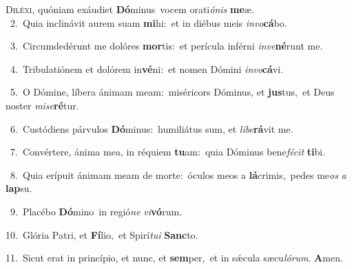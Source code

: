 \lettrine{\initial\textcolor{\initialcolor}{D}}{iléxi,} quóniam exáudiet \textbf{Dó}\-minus~\star vocem orati\-\textit{ó}\-\textit{nis} \textbf{me}\-æ.\\
{\numbfont\textcolor{\numbcolor}{~2.}}~Quia inclinávit aurem suam \textbf{mi}\-hi:~\star et in diébus meis \textit{in}\-\textit{vo}\textbf{cá}bo.\par
{\numbfont\textcolor{\numbcolor}{~3.}}~Circumdedérunt me dolóres \textbf{mor}\-tis:~\star et perícula inférni \textit{in}\-\textit{ve}\textbf{né}runt me.\par
{\numbfont\textcolor{\numbcolor}{~4.}}~Tribulatiónem et dolórem in\-\textbf{vé}\-ni:~\star et nomen Dómini \textit{in}\-\textit{vo}\textbf{cá}vi.\par
{\numbfont\textcolor{\numbcolor}{~5.}}~O Dómine, líbera ánimam meam:~\dagger miséricors Dóminus, et \textbf{jus}\-tus,~\star et Deus noster \textit{mi}\-\textit{se}\textbf{ré}tur.\par
{\numbfont\textcolor{\numbcolor}{~6.}}~Custódiens párvulos \textbf{Dó}\-minus:~\star humiliátus sum, et \textit{li}\-\textit{be}\textbf{rá}vit me.\par
{\numbfont\textcolor{\numbcolor}{~7.}}~Convértere, ánima mea, in réquiem \textbf{tu}\-am:~\star quia Dóminus bene\-\textit{fé}\-\textit{cit} \textbf{ti}\-bi.\par
{\numbfont\textcolor{\numbcolor}{~8.}}~Quia erípuit ánimam meam de morte:~\dagger óculos meos a \textbf{lá}\-crimis,~\star pedes me\textit{os} \textit{a} \textbf{lap}\-su.\par
{\numbfont\textcolor{\numbcolor}{~9.}}~Placébo \textbf{Dó}\-mino~\star in regió\textit{ne} \textit{vi}\-\textbf{vó}rum.\par
{\numbfont\textcolor{\numbcolor}{10.}}~Glória Patri, et \textbf{Fí}\-lio,~\star et Spirí\-\textit{tu}\-\textit{i} \textbf{Sanc}\-to.\par
{\numbfont\textcolor{\numbcolor}{11.}}~Sicut erat in princípio, et nunc, et \textbf{sem}\-per,~\star et in sǽcula sæcu\-\textit{ló}\-\textit{rum}. \textbf{A}\-men.\par
